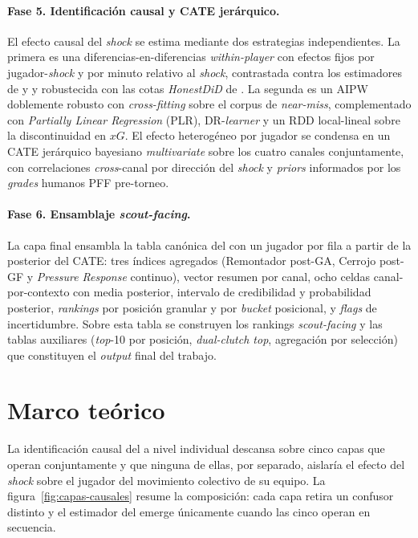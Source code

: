 \paragraph{Fase 5. Identificación causal y CATE jerárquico.}
El efecto causal del \textit{shock} se estima mediante dos estrategias
independientes. La primera es una diferencias-en-diferencias
\textit{within-player} con efectos fijos por jugador-\textit{shock} y
por minuto relativo al \textit{shock}, contrastada contra los
estimadores de \textcite{SunAbraham2021} y
\textcite{BorusyakJaravelSpiess2024} y robustecida con las cotas
\textit{HonestDiD} de \textcite{RambachanRoth2023}. La segunda es un
AIPW doblemente robusto con \textit{cross-fitting} sobre el corpus de
\textit{near-miss}, complementado con \textit{Partially Linear
Regression} (PLR), DR-\textit{learner} y un RDD local-lineal sobre la
discontinuidad en $xG$. El efecto heterogéneo por jugador se condensa
en un CATE jerárquico bayesiano \textit{multivariate} sobre los cuatro
canales conjuntamente, con correlaciones \textit{cross}-canal por
dirección del \textit{shock} y \textit{priors} informados por los
\textit{grades} humanos PFF pre-torneo.

\paragraph{Fase 6. Ensamblaje \textit{scout-facing}.}
La capa final ensambla la tabla canónica del \CCV con un jugador por
fila a partir de la posterior del CATE: tres índices agregados
(Remontador post-GA, Cerrojo post-GF y \textit{Pressure Response}
continuo), vector resumen por canal, ocho celdas canal-por-contexto
con media posterior, intervalo de credibilidad y probabilidad
posterior, \textit{rankings} por posición granular y por
\textit{bucket} posicional, y \textit{flags} de incertidumbre. Sobre
esta tabla se construyen los rankings \textit{scout-facing} y las
tablas auxiliares (\textit{top}-10 por posición, \textit{dual-clutch
top}, agregación por selección) que constituyen el \textit{output}
final del trabajo.


\section{Marco teórico}
\label{sec:marco-teorico}

La identificación causal del \CCV a nivel individual descansa sobre
cinco capas que operan conjuntamente y que ninguna de ellas, por
separado, aislaría el efecto del \textit{shock} sobre el jugador del
movimiento colectivo de su equipo. La figura~\ref{fig:capas-causales}
resume la composición: cada capa retira un confusor distinto y el
estimador del \CCV emerge únicamente cuando las cinco operan en
secuencia.

